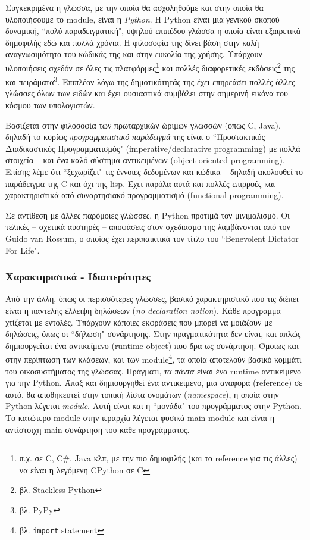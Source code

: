 Συγκεκριμένα η γλώσσα, με την οποία θα ασχοληθούμε και στην οποία θα
υλοποιήσουμε το module, είναι η \textit{Python}\cite{python}. Η Python είναι μια
γενικού σκοπού δυναμική, ``πολύ-παραδειγματική", υψηλού επιπέδου γλώσσα η οποία
είναι εξαιρετικά δημοφιλής εδώ και πολλά χρόνια. Η φιλοσοφία της δίνει βάση στην
καλή αναγνωσιμότητα του κώδικάς της και στην ευκολία της χρήσης. Υπάρχουν
υλοποιήσεις σχεδόν σε όλες τις  πλατφόρμες\footnote{π.χ. σε C, C\#, Java κλπ, με
την πιο δημοφιλής (και το reference για τις άλλες) να είναι η λεγόμενη CPython
σε C} και πολλές διαφορετικές εκδόσεις\footnote{βλ. Stackless Python} της και
πειράματα\footnote{βλ. PyPy}. Επιπλέον λόγω της δημοτικότητάς της έχει επηρεάσει
πολλές άλλες γλώσσες όλων των ειδών και έχει ουσιαστικά συμβάλει στην σημερινή
εικόνα του κόσμου των υπολογιστών.

Βασίζεται στην φιλοσοφία των πρωταρχικών ώριμων γλωσσών (όπως C, Java), δηλαδή
το κυρίως \textit{προγραμματιστικό παράδειγμά} της είναι ο ``Προστακτικός-
Διαδικαστικός Προγραμματισμός" (imperative/declarative programming) με πολλά
στοιχεία – και ένα καλό σύστημα αντικειμένων (object-oriented programming).
Επίσης λέμε ότι ``ξεχωρίζει" τις έννοιες δεδομένων και κώδικα – δηλαδή
ακολουθεί το παράδειγμα της C και όχι της lisp. Έχει παρόλα αυτά και πολλές
επιρροές και χαρακτηριστικά από συναρτησιακό προγραμματισμό (functional
programming).

Σε αντίθεση με άλλες παρόμοιες γλώσσες, η Python προτιμά τον μινιμαλισμό. Οι
τελικές – σχετικά αυστηρές – αποφάσεις στον σχεδιασμό της λαμβάνονται από τον
Guido van Rossum, ο οποίος έχει περιπαικτικά τον τίτλο του ``Benevolent Dictator
For Life".\cite{guido}

\subsubsection{Χαρακτηριστικά - Ιδιαιτερότητες}

Από την άλλη, όπως οι περισσότερες γλώσσες, βασικό χαρακτηριστικό που τις διέπει
είναι η παντελής έλλειψη δηλώσεων (\textit{no declaration notion}). Κάθε
πρόγραμμα χτίζεται με εντολές. Υπάρχουν κάποιες εκφράσεις που μπορεί να μοιάζουν
με δηλώσεις, όπως οι ``δήλωση" συνάρτησης. Στην πραγματικότητα δεν είναι, και
απλώς δημιουργείται ένα αντικείμενο (runtime object) που δρα ως συνάρτηση.
Όμοιως και στην περίπτωση των κλάσεων, και των module\footnote{βλ.
\texttt{import} statement}, τα οποία αποτελούν βασικό κομμάτι του οικοσυστήματος
της γλώσσας. Πράγματι, \textit{τα πάντα} είναι ένα runtime αντικείμενο για την
Python. Άπαξ και δημιουργηθεί ένα αντικείμενο, μια αναφορά (reference) σε αυτό,
θα αποθηκευτεί στην τοπική λίστα ονομάτων (\textit{namespace}), η οποία στην
Python λέγεται \textit{module}. Αυτή είναι και η ``μονάδα" του προγράμματος στην
Python. Το κατώτερο module στην ιεραρχία λέγεται φυσικά main module και είναι η
αντίστοιχη main συνάρτηση του κάθε προγράμματος.

